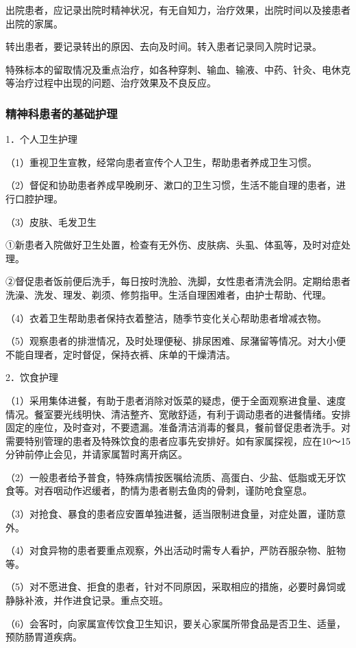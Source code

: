 出院患者，应记录出院时精神状况，有无自知力，治疗效果，出院时间以及接患者出院的家属。

转出患者，要记录转出的原因、去向及时间。转入患者记录同入院时记录。

特殊标本的留取情况及重点治疗，如各种穿刺、输血、输液、中药、针灸、电休克等治疗过程中出现的问题、治疗效果及不良反应。

\subsubsection{精神科患者的基础护理}

1．个人卫生护理

（1）重视卫生宣教，经常向患者宣传个人卫生，帮助患者养成卫生习惯。

（2）督促和协助患者养成早晚刷牙、漱口的卫生习惯，生活不能自理的患者，进行口腔护理。

（3）皮肤、毛发卫生

①新患者入院做好卫生处置，检查有无外伤、皮肤病、头虱、体虱等，及时对症处理。

②督促患者饭前便后洗手，每日按时洗脸、洗脚，女性患者清洗会阴。定期给患者洗澡、洗发、理发、剃须、修剪指甲。生活自理困难者，由护士帮助、代理。

（4）衣着卫生帮助患者保持衣着整洁，随季节变化关心帮助患者增减衣物。

（5）观察患者的排泄情况，及时处理便秘、排尿困难、尿潴留等情况。对大小便不能自理者，定时督促，保持衣裤、床单的干燥清洁。

2．饮食护理

（1）采用集体进餐，有助于患者消除对饭菜的疑虑，便于全面观察进食量、速度情况。餐室要光线明快、清洁整齐、宽敞舒适，有利于调动患者的进餐情绪。安排固定的座位，及时查对，不要遗漏。准备清洁消毒的餐具，餐前督促患者洗手。对需要特别管理的患者及特殊饮食的患者应事先安排好。如有家属探视，应在10～15分钟前停止会见，并请家属暂时离开病区。

（2）一般患者给予普食，特殊病情按医嘱给流质、高蛋白、少盐、低脂或无牙饮食等。对吞咽动作迟缓者，酌情为患者剔去鱼肉的骨刺，谨防呛食窒息。

（3）对抢食、暴食的患者应安置单独进餐，适当限制进食量，对症处置，谨防意外。

（4）对食异物的患者要重点观察，外出活动时需专人看护，严防吞服杂物、脏物等。

（5）对不愿进食、拒食的患者，针对不同原因，采取相应的措施，必要时鼻饲或静脉补液，并作进食记录。重点交班。

（6）会客时，向家属宣传饮食卫生知识，要关心家属所带食品是否卫生、适量，预防肠胃道疾病。

